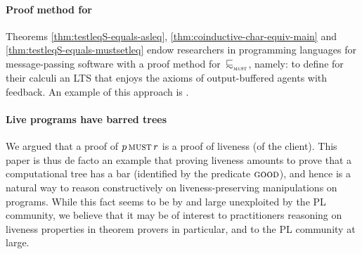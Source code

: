 \paragraph{Proof method for \mustpreorder}
Theorems \ref{thm:testleqS-equals-asleq}, \ref{thm:coinductive-char-equiv-main}
and \ref{thm:testleqS-equals-mustsetleq} endow researchers in programming
languages for message-passing software with a proof method for~$\testleqS$,
namely: to define for their calculi an LTS that enjoys the axioms of
output-buffered agents with feedback. %
An example of this approach is .
%


\paragraph{Live programs have barred trees}  We argued that a proof
of $p \operatorname{\textsc{must}} r$ is a proof of liveness (of the
client). This paper is thus de facto an example that proving
liveness amounts to prove that a computational tree has a bar (identified
by the predicate $\goodSym$), and hence \barinduction is a natural way
to reason constructively on liveness-preserving manipulations on programs.
  While this fact seems to be by and large 
  unexploited by the PL community, we believe that it may %
  be of interest to practitioners reasoning on liveness
  properties %
  in theorem provers in particular, and to the PL
  community at large.

